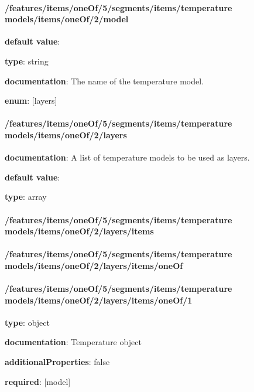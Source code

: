 \paragraph{/features/items/oneOf/5/segments/items/temperature models/items/oneOf/2/model} \begin{itemized}
\item {\bf default value}: 
\item {\bf type}: string
\item {\bf documentation}: The name of the temperature model.
\item {\bf enum}: [layers]\end{itemized}\paragraph{/features/items/oneOf/5/segments/items/temperature models/items/oneOf/2/layers} \begin{itemized}
\item {\bf documentation}: A list of temperature models to be used as layers.
\item {\bf default value}: 
\item {\bf type}: array
\paragraph{/features/items/oneOf/5/segments/items/temperature models/items/oneOf/2/layers/items} \begin{itemized}
\end{itemized}\end{itemized}\paragraph{/features/items/oneOf/5/segments/items/temperature models/items/oneOf/2/layers/items/oneOf} \begin{itemized}
\end{itemized}\paragraph{/features/items/oneOf/5/segments/items/temperature models/items/oneOf/2/layers/items/oneOf/1} \begin{itemized}
\item {\bf type}: object
\item {\bf documentation}: Temperature object
\item {\bf additionalProperties}: false
\item {\bf required}: [model]\end{itemized}
